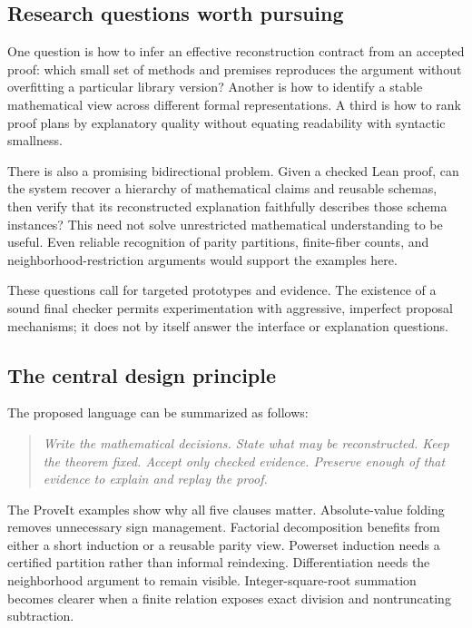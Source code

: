 \documentclass[11pt,a4paper]{article}
\theoremstyle{remark}
\begin{document}
\subsection{Research questions worth pursuing}

One question is how to infer an effective reconstruction contract from an accepted proof: which small set of methods and premises reproduces the argument without overfitting a particular library version? Another is how to identify a stable mathematical view across different formal representations. A third is how to rank proof plans by explanatory quality without equating readability with syntactic smallness.

There is also a promising bidirectional problem. Given a checked Lean proof, can the system recover a hierarchy of mathematical claims and reusable schemas, then verify that its reconstructed explanation faithfully describes those schema instances? This need not solve unrestricted mathematical understanding to be useful. Even reliable recognition of parity partitions, finite-fiber counts, and neighborhood-restriction arguments would support the examples here.

These questions call for targeted prototypes and evidence. The existence of a sound final checker permits experimentation with aggressive, imperfect proposal mechanisms; it does not by itself answer the interface or explanation questions.

\subsection{The central design principle}

The proposed language can be summarized as follows:
\begin{quote}
\emph{Write the mathematical decisions. State what may be reconstructed. Keep the theorem fixed. Accept only checked evidence. Preserve enough of that evidence to explain and replay the proof.}
\end{quote}

The ProveIt examples show why all five clauses matter. Absolute-value folding removes unnecessary sign management. Factorial decomposition benefits from either a short induction or a reusable parity view. Powerset induction needs a certified partition rather than informal reindexing. Differentiation needs the neighborhood argument to remain visible. Integer-square-root summation becomes clearer when a finite relation exposes exact division and nontruncating subtraction.
\end{document}
